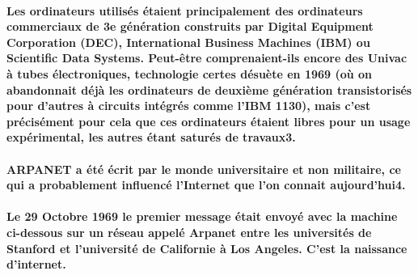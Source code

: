 \paragraph{
  Les ordinateurs utilisés étaient principalement des ordinateurs commerciaux de 3e génération construits par Digital Equipment Corporation (DEC), International Business Machines (IBM) ou Scientific Data Systems. Peut-être comprenaient-ils encore des Univac à tubes électroniques, technologie certes désuète en 1969 (où on abandonnait déjà les ordinateurs de deuxième génération transistorisés pour d'autres à circuits intégrés comme l'IBM 1130), mais c'est précisément pour cela que ces ordinateurs étaient libres pour un usage expérimental, les autres étant saturés de travaux3.
}

\paragraph{
  ARPANET a été écrit par le monde universitaire et non militaire, ce qui a probablement influencé l'Internet que l'on connait aujourd'hui4.
}

\paragraph{
  Le 29 Octobre 1969 le premier message était envoyé avec la machine ci-dessous sur un réseau appelé Arpanet entre les universités de Stanford et l'université de Californie à Los Angeles. C'est la naissance d'internet.
}
